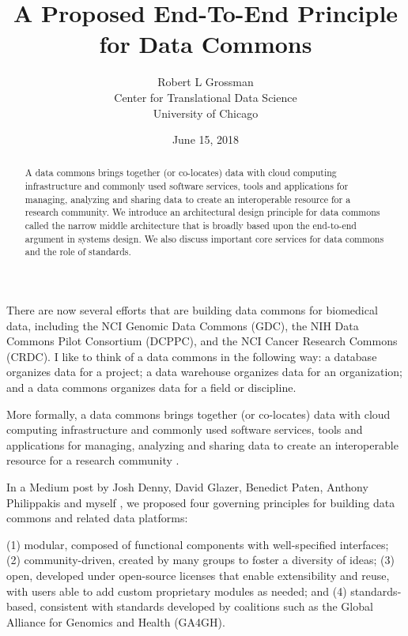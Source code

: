 \documentclass{article}
\title{A Proposed End-To-End Principle \protect\\ for Data Commons}
\author{Robert L Grossman \protect\\
Center for Translational Data Science \protect\\
University of Chicago
}
\date{June 15, 2018}
\newcommand{\ph}[1]{\medbreak \noindent {\bf #1}}
\begin{document}
\maketitle

\begin{abstract}
A data commons brings together (or co-locates) data with cloud computing infrastructure and commonly used software services, tools and applications for managing, analyzing and sharing data to create an interoperable resource for a research community.  We introduce an architectural design principle for data commons called the narrow middle architecture that is broadly based upon the end-to-end argument in systems design.  We also discuss important core services for data commons and the role of standards.    
\end{abstract}


\ph{Introduction.} There are now several efforts that are building data commons for biomedical data, including the NCI Genomic Data Commons (GDC), the NIH Data Commons Pilot Consortium (DCPPC), and the NCI Cancer Research Commons (CRDC). I like to think of a data commons in the following way: a database organizes data for a project; a data warehouse organizes data for an organization; and a data commons organizes data for a field or discipline.

More formally, a data commons brings together (or co-locates) data with cloud computing infrastructure and commonly used software services, tools and applications for managing, analyzing and sharing data to create an interoperable resource for a research community \cite{grossman2016case}.

In a Medium post by Josh Denny, David Glazer, Benedict Paten, Anthony Philippakis and myself \cite{paten2017biosphere}, we proposed four governing principles for building data commons and related data platforms:

(1) modular, composed of functional components with well-specified interfaces; (2) community-driven, created by many groups to foster a diversity of ideas; (3) open, developed under open-source licenses that enable extensibility and reuse, with users able to add custom proprietary modules as needed; and (4) standards-based, consistent with standards developed by coalitions such as the Global Alliance for Genomics and Health (GA4GH). 

\end{document}
